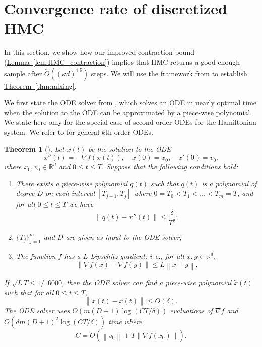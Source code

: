 \documentclass[11pt]{article}
\numberwithin{equation}{section}
\newtheorem{theorem}{Theorem}[section]
\theoremstyle{definition}
\theoremstyle{plain}
\newcommand{\R}{\mathbb R}
\newcommand{\ie}{i.\,e.}
\newcommand{\expref}[2]{\hyperref[#2]{#1~\ref{#2}}}
\newcommand{\norm}[1]{\left\lVert #1 \right\rVert}
\newcommand{\grad}{\nabla}
\begin{document}
\section{Convergence rate of discretized HMC}
In this section, we show how our improved contraction bound (\expref{Lemma}{lem:HMC_contraction}) implies that HMC returns a good enough sample after $\tilde{O}((\kappa d)^{1.5})$ steps. We will use the framework from \cite{LSV18} to establish \expref{Theorem}{thm:mixing}.

We first state the ODE solver from \cite{LSV18}, which solves an ODE in nearly optimal time when the solution to the ODE can be approximated by a piece-wise polynomial. We state here only for the special case of second order ODEs for the Hamiltonian system. We refer to \cite{LSV18} for general $k$th order ODEs.

\begin{theorem}[{\cite[Theorem 2.5]{LSV18}}]
	\label{thm:ODE_solver}
	Let $x(t)$ be the solution to the ODE
	\begin{equation}
	x''(t) = -\grad f(x(t)), \quad x(0) = x_0, \quad x'(0) = v_0.
	\end{equation}
	where $x_0,v_0 \in \R^d$ and $0\le t\le T$. Suppose that the following conditions hold:
	\begin{enumerate}
		\item There exists a piece-wise polynomial $q(t)$ such that $q(t)$ is a polynomial of degree $D$ on each interval $[T_{j-1},T_j]$ where $0=T_0 < T_1 < \dots <T_m = T$, and for all $0\le t\le T$ we have
		\begin{equation}
		\norm{q(t) - x''(t)} \le \frac{\delta}{T^2};
		\end{equation}
		\item $\{T_j\}_{j=1}^m$ and $D$ are given as input to the ODE solver;
		\item The function $f$ has a $L$-Lipschitz gradient; \ie, for all $x,y\in\R^d$,
		\begin{equation}
		\norm{\grad f(x) - \grad f(y)} \le L \norm{x-y}.
		\end{equation}
	\end{enumerate}
	If $\sqrt{L} T \le 1/16000$, then the ODE solver can find a piece-wise polynomial $\tilde{x}(t)$ such that for all $0\le t\le T$,
	\begin{equation}
	\norm{\tilde{x}(t) - x(t)} \le O(\delta).
	\end{equation}
	The ODE solver uses $O(m(D+1) \log(CT/\delta))$ evaluations of $\grad f$ and $O(dm (D+1)^2 \log(CT/\delta))$ time where
	\begin{equation}
	C = O\left(\norm{v_0} + T\norm{\grad f(x_0)} \right).
	\end{equation}
\end{theorem}
\end{document}
